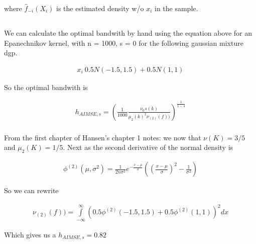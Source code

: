 \documentclass[12pt]{article}
\begin{document}
where $\hat{f}_{-i}(X_i)$ is the estimated density w/o $x_i$ in the sample.

\subsection{}
\subsubsection{}

We can calculate the optimal bandwith by hand using the equation above for an Epanechnikov kernel, with n = 1000, s = 0 for the following gaussian mixture dgp.


\begin{gather*}
x_i ~ 0.5 N(-1.5,1.5) + 0.5 N(1,1)
\end{gather*}

So the optimal bandwith is

\begin{gather*}
h_{AIMSE,s} = \left( \frac{ 1   }{1000}     \frac{\nu_0s(k)}{  \mu_2(k)^2 \nu_{(2)}(f))} \right)^{\frac{1}{1-4}}\\
\end{gather*}

From the first chapter of Hansen's chapter 1 notes: we now that $\nu(K) = 3/5$ and $\mu_2(K)  = 1/5$. Next as the second derivative of the normal density is

\begin{gather*}
\phi^{(2)}(\mu,\sigma^2) = \frac{1}{2n\sigma^2} e^{- \frac{x-\mu}{\sigma}} \left( \left(\frac{x-\mu}{\sigma}\right)^2 - \frac{1}{\sigma^2}\right)
\end{gather*}


So we can rewrite

\begin{gather*}
  \nu_{(2)}(f)) = \int\limits_{-\infty}^{\infty} \left( 0.5\phi^{(2)}(-1.5,1.5) + 0.5\phi^{(2)}(1,1)  \right)^2 dx
\end{gather*}

Which gives us a $h_{AIMSE,s} = 0.82$


\subsubsection{}
\end{document}
